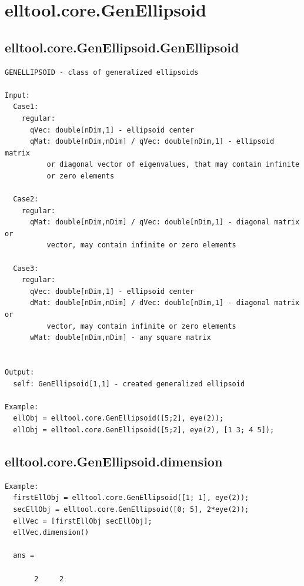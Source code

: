 \documentclass[letterpaper,10pt,english]{sphinxmanual}
\begin{document}
\section{elltool.core.GenEllipsoid}
\label{chap_functions:elltool-core-genellipsoid}

\subsection{elltool.core.GenEllipsoid.GenEllipsoid}
\label{chap_functions:elltool-core-genellipsoid-genellipsoid}
\begin{Verbatim}[commandchars=\\\{\}]
GENELLIPSOID - class of generalized ellipsoids

Input:
  Case1:
    regular:
      qVec: double[nDim,1] - ellipsoid center
      qMat: double[nDim,nDim] / qVec: double[nDim,1] - ellipsoid matrix
          or diagonal vector of eigenvalues, that may contain infinite
          or zero elements

  Case2:
    regular:
      qMat: double[nDim,nDim] / qVec: double[nDim,1] - diagonal matrix or
          vector, may contain infinite or zero elements

  Case3:
    regular:
      qVec: double[nDim,1] - ellipsoid center
      dMat: double[nDim,nDim] / dVec: double[nDim,1] - diagonal matrix or
          vector, may contain infinite or zero elements
      wMat: double[nDim,nDim] - any square matrix


Output:
  self: GenEllipsoid[1,1] - created generalized ellipsoid

Example:
  ellObj = elltool.core.GenEllipsoid([5;2], eye(2));
  ellObj = elltool.core.GenEllipsoid([5;2], eye(2), [1 3; 4 5]);
\end{Verbatim}


\subsection{elltool.core.GenEllipsoid.dimension}
\label{chap_functions:elltool-core-genellipsoid-dimension}
\begin{Verbatim}[commandchars=\\\{\}]
Example:
  firstEllObj = elltool.core.GenEllipsoid([1; 1], eye(2));
  secEllObj = elltool.core.GenEllipsoid([0; 5], 2*eye(2));
  ellVec = [firstEllObj secEllObj];
  ellVec.dimension()

  ans =

       2     2
\end{Verbatim}
\end{document}
